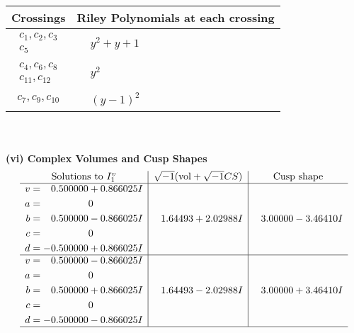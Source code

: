 \documentclass[1p]{elsarticle_modified}
\theoremstyle{definition}
\newcommand{\I}{\sqrt{-1}}
\begin{document}
\begin{tabular}{m{50pt}|m{274pt}}
Crossings & \hspace{64pt}Riley Polynomials at each crossing \\
\hline $$\begin{aligned}c_{1},c_{2},c_{3}\\c_{5}\end{aligned}$$&$\begin{aligned}
&y^2+y+1
\end{aligned}$\\
\hline $$\begin{aligned}c_{4},c_{6},c_{8}\\c_{11},c_{12}\end{aligned}$$&$\begin{aligned}
&y^2
\end{aligned}$\\
\hline $$\begin{aligned}c_{7},c_{9},c_{10}\end{aligned}$$&$\begin{aligned}
&(y-1)^2
\end{aligned}$\\
\hline
\end{tabular}\\~\\
\newpage\flushleft \textbf{(vi) Complex Volumes and Cusp Shapes}
$$\begin{array}{c|c|c}  
\text{Solutions to }I^v_{1}& \I (\text{vol} + \sqrt{-1}CS) & \text{Cusp shape}\\
 \hline 
\begin{aligned}
v &= \phantom{-}0.500000 + 0.866025 I \\
a &= \phantom{-0.000000 } 0 \\
b &= \phantom{-}0.500000 - 0.866025 I \\
c &= \phantom{-0.000000 } 0 \\
d &= -0.500000 + 0.866025 I\end{aligned}
 & \phantom{-}1.64493 + 2.02988 I & \phantom{-}3.00000 - 3.46410 I \\ \hline\begin{aligned}
v &= \phantom{-}0.500000 - 0.866025 I \\
a &= \phantom{-0.000000 } 0 \\
b &= \phantom{-}0.500000 + 0.866025 I \\
c &= \phantom{-0.000000 } 0 \\
d &= -0.500000 - 0.866025 I\end{aligned}
 & \phantom{-}1.64493 - 2.02988 I & \phantom{-}3.00000 + 3.46410 I\\
 \hline 
 \end{array}$$\newpage\newpage\renewcommand{\arraystretch}{1}
\end{document}
